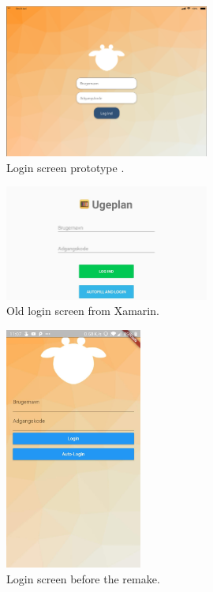 \begin{figure}[H]
    \centering
    \includegraphics[width=0.6\textwidth]{sections/1Sprint/images/loginscreen_prototype.png}
    \caption{Login screen prototype \citep{loginPrototypeGitHub} .}
    \label{fig:loginscreenPrototype}
\end{figure}

\begin{figure}[H]
    \centering
    \includegraphics[width=0.6\textwidth]{sections/1Sprint/images/loginScreen_original.jpg}
    \caption{Old login screen from Xamarin.}
    \label{fig:loginscreenXamarin}
\end{figure}

\begin{figure}[H]
  \centering
    \includegraphics[width=0.4\textwidth]{sections/1Sprint/images/loginscreen_firstFlutter.jpg}
    \caption{Login screen before the remake.}
    \label{fig:d}
\end{figure}

